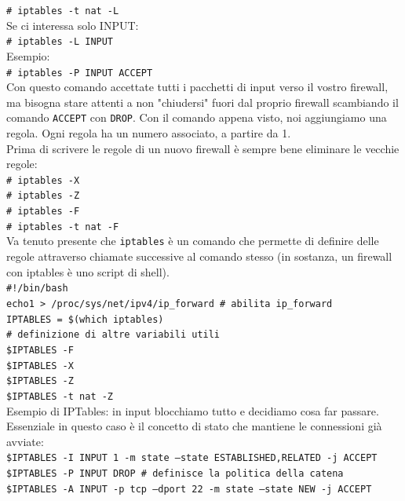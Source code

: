 \documentclass[a4paper]{report}
\newcommand\tab[1][1cm]{\hspace*{#1}}
\begin{document}
\tab\texttt{\# iptables -t nat -L}\\
Se ci interessa solo INPUT:\\
\tab\texttt{\# iptables -L INPUT}\\
Esempio:\\
\tab\texttt{\# iptables -P INPUT ACCEPT}\\
Con questo comando accettate tutti i pacchetti di input verso il vostro firewall, ma bisogna stare attenti a non "chiudersi" fuori dal proprio firewall scambiando il comando \texttt{ACCEPT} con \texttt{DROP}. Con il comando appena visto, noi aggiungiamo una regola. Ogni regola ha un numero associato, a partire da 1.\\
Prima di scrivere le regole di un nuovo firewall è sempre bene eliminare le vecchie regole:\\
\tab\texttt{\# iptables -X}\\
\tab\texttt{\# iptables -Z}\\
\tab\texttt{\# iptables -F}\\
\tab\texttt{\# iptables -t nat -F}\\
Va tenuto presente che \texttt{iptables} è un comando che permette di definire delle regole attraverso chiamate successive al comando stesso (in sostanza, un firewall con iptables è uno script di shell).\\
\tab\texttt{\#!/bin/bash}\\
\tab\texttt{echo1 > /proc/sys/net/ipv4/ip\_forward \# abilita ip\_forward}\\
\tab\texttt{IPTABLES = \$(which iptables)}\\
\tab\texttt{\# definizione di altre variabili utili}\\
\tab\texttt{\$IPTABLES -F}\\
\tab\texttt{\$IPTABLES -X}\\
\tab\texttt{\$IPTABLES -Z}\\
\tab\texttt{\$IPTABLES -t nat -Z}\\
Esempio di IPTables: in input blocchiamo tutto e decidiamo cosa far passare. Essenziale in questo caso è il concetto di stato che mantiene le connessioni già avviate:\\
\tab\texttt{\$IPTABLES -I INPUT 1 -m state --state ESTABLISHED,RELATED -j ACCEPT}\\
\tab\texttt{\$IPTABLES -P INPUT DROP \# definisce la politica della catena}\\
\tab\texttt{\$IPTABLES -A INPUT -p tcp --dport 22 -m state --state NEW -j ACCEPT}\\
\end{document}
